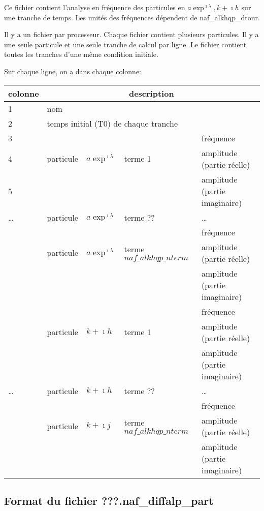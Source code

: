 \documentclass[11pt]{article}
\begin{document}
Ce fichier contient l'analyse en fr\'equence des particules en $a\exp^{\imath\lambda}, k+\imath h$ sur une tranche de temps. Les unit\'es des fr\'equences d\'ependent de naf\_alkhqp\_dtour.

 Il y a un fichier par processeur. Chaque fichier contient plusieurs particules. Il y a une seule particule et une seule tranche de calcul  par ligne. Le fichier contient toutes les tranches d'une m\^eme  condition initiale.


Sur chaque ligne, on a dans chaque colonne: 

\begin{tabularx}{\textwidth}{|l|l|l|l|X|}
 \hline
 colonne &      \multicolumn{4}{c|}{description} \\ \hline
1  &    \multicolumn{4}{l|}{nom} \\ \hline
2  &    \multicolumn{4}{l|}{temps initial (T0) de chaque tranche} \\ \hline
3 & &   & & fr\'equence\\
4 &particule &$a\exp^{\imath\lambda}$& terme 1 & amplitude (partie r\'eelle)\\
5 & &   & &amplitude (partie imaginaire)\\ \hline
\dots & particule &$a\exp^{\imath\lambda}$& terme ?? &\dots \\ \hline
 & &   & &fr\'equence\\
 &particule & $a\exp^{\imath\lambda}$ & terme $naf\_alkhqp\_nterm$ & amplitude (partie r\'eelle)\\
 & &   & &amplitude (partie imaginaire)\\ \hline
 & &   & & fr\'equence\\
 &particule &$k+\imath h$& terme 1 & amplitude (partie r\'eelle)\\
 & &   & &amplitude (partie imaginaire)\\ \hline
\dots & particule &$k+\imath h$& terme ?? &\dots \\ \hline
 & &   & &fr\'equence\\
 &particule & $k+\imath j$ & terme $naf\_alkhqp\_nterm$ & amplitude (partie r\'eelle)\\
 & &   & &amplitude (partie imaginaire)\\ \hline
\end{tabularx}

\subsection{Format du fichier {\bf ???.naf\_diffalp\_part} }
\end{document}
